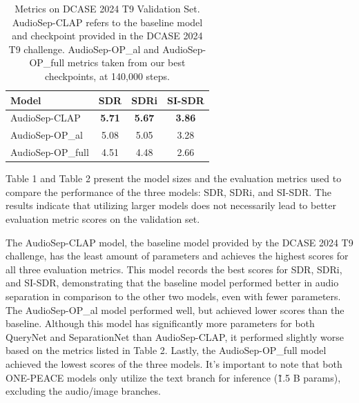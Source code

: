\documentclass[11pt]{article}
\begin{document}
\begin{table}[!htbp]
  \centering

  \begin{tabular}{lccc}
    \hline
    \textbf{Model}       & \textbf{SDR}  & \textbf{SDRi} & \textbf{SI-SDR} \\
    \hline
     AudioSep-CLAP       & \textbf{5.71} & \textbf{5.67} & \textbf{3.86}   \\
     AudioSep-OP\_al     & 5.08          & 5.05          & 3.28   \\
     AudioSep-OP\_full   & 4.51          & 4.48          & 2.66   \\
    \hline
  \end{tabular}
  \caption{Metrics on DCASE 2024 T9 Validation Set. AudioSep-CLAP refers to the baseline model and checkpoint provided in the DCASE 2024 T9 challenge. AudioSep-OP\_al and AudioSep-OP\_full metrics taken from our best checkpoints, at 140,000 steps.}
  \label{tab:accents}
\end{table}

Table 1 and Table 2 present the model sizes and the evaluation metrics used to compare the performance of the three models: SDR, SDRi, and SI-SDR. The results indicate that utilizing larger models does not necessarily lead to better evaluation metric scores on the validation set.  

The AudioSep-CLAP model, the baseline model provided by the DCASE 2024 T9 challenge, has the least amount of parameters and achieves the highest scores for all three evaluation metrics. This model records the best scores for SDR, SDRi, and SI-SDR, demonstrating that the baseline model performed better in audio separation in comparison to the other two models, even with fewer parameters. The AudioSep-OP\_al model performed well, but achieved lower scores than the baseline. Although this model has significantly more parameters for both QueryNet and SeparationNet than AudioSep-CLAP, it performed slightly worse based on the metrics listed in Table 2. Lastly, the AudioSep-OP\_full model achieved the lowest scores of the three models. It's important to note that both ONE-PEACE models only utilize the text branch for inference (\~1.5 B params), excluding the audio/image branches.
\end{document}
